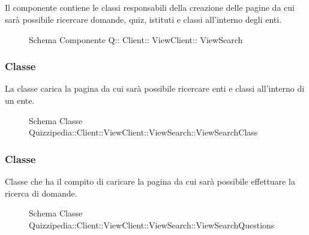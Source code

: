 \subsection{}
Il componente contiene le classi responsabili della creazione delle pagine da cui sarà possibile ricercare domande, quiz, istituti e classi all'interno degli enti.
\begin{figure}[H]
\centering
\noindent{}
\caption[Schema Componente Quizzipedia::Client::ViewClient::ViewSearch]{Schema Componente Q:: Client:: ViewClient:: ViewSearch}
\end{figure}
\subsubsection{Classe }
La classe carica la pagina da cui sarà possibile ricercare enti e classi all'interno di un ente.
\begin{figure}[H]
\centering
\noindent{}
\caption[Schema Classe ViewSearchClass]{Schema Classe Quizzipedia::Client::ViewClient::ViewSearch::ViewSearchClass}
\end{figure}
\subsubsection{Classe }
Classe che ha il compito di caricare la pagina da cui sarà possibile effettuare la ricerca di domande.
\begin{figure}[H]
\centering
\noindent{}
\caption[Schema Classe ViewSearchQuestions]{Schema Classe Quizzipedia::Client::ViewClient::ViewSearch::ViewSearchQuestions}
\end{figure}
